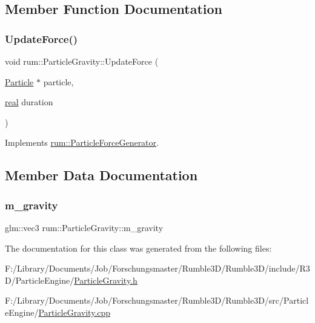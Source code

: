 \subsection{Member Function Documentation}
\mbox{\label{classrum_1_1_particle_gravity_a8b943480e3856d1818e5090097403679}} 
\subsubsection{\texorpdfstring{Update\+Force()}{UpdateForce()}}
{\footnotesize\ttfamily void rum\+::\+Particle\+Gravity\+::\+Update\+Force (\begin{DoxyParamCaption}\item[{\hyperlink{classrum_1_1_particle}{Particle} $\ast$}]{particle,  }\item[{\hyperlink{namespacerum_a7e8cca23573d5eaead0f138cbaa4862c}{real}}]{duration }\end{DoxyParamCaption})\hspace{0.3cm}{\ttfamily [virtual]}}



Implements \hyperlink{classrum_1_1_particle_force_generator_aca758295718deb8569796185ccbe8d54}{rum\+::\+Particle\+Force\+Generator}.



\subsection{Member Data Documentation}
\mbox{\label{classrum_1_1_particle_gravity_a9fbc86ccd5d18e93626a6c4b0fc3b5e2}} 
\subsubsection{\texorpdfstring{m\+\_\+gravity}{m\_gravity}}
{\footnotesize\ttfamily glm\+::vec3 rum\+::\+Particle\+Gravity\+::m\+\_\+gravity\hspace{0.3cm}{\ttfamily [protected]}}



The documentation for this class was generated from the following files\+:\begin{DoxyCompactItemize}
\item 
F\+:/\+Library/\+Documents/\+Job/\+Forschungsmaster/\+Rumble3\+D/\+Rumble3\+D/include/\+R3\+D/\+Particle\+Engine/\hyperlink{_particle_gravity_8h}{Particle\+Gravity.\+h}\item 
F\+:/\+Library/\+Documents/\+Job/\+Forschungsmaster/\+Rumble3\+D/\+Rumble3\+D/src/\+Particle\+Engine/\hyperlink{_particle_gravity_8cpp}{Particle\+Gravity.\+cpp}\end{DoxyCompactItemize}
